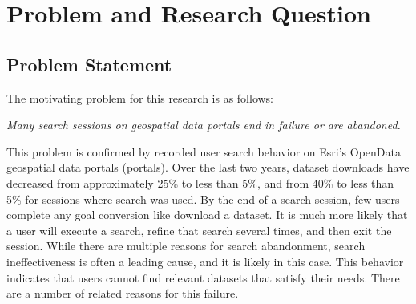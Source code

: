 \chapter{Problem and Research Question} \label{ch:[chapter 3 label]}

\section{Problem Statement}

The motivating problem for this research is as follows:
\linebreak

\emph{Many search sessions on geospatial data portals end in failure or are abandoned.}
\linebreak

This problem is confirmed by recorded user search behavior on Esri's OpenData geospatial data portals (portals). Over the last two years, dataset downloads have decreased from approximately 25\% to less than 5\%, and from 40\% to less than 5\% for sessions where search was used. By the end of a search session, few users complete any goal conversion like download a dataset. It is much more likely that a user will execute a search, refine that search several times, and then exit the session. While there are multiple reasons for search abandonment, search ineffectiveness is often a leading cause, and it is likely in this case. This behavior indicates that users cannot find relevant datasets that satisfy their needs. There are a number of related reasons for this failure.

